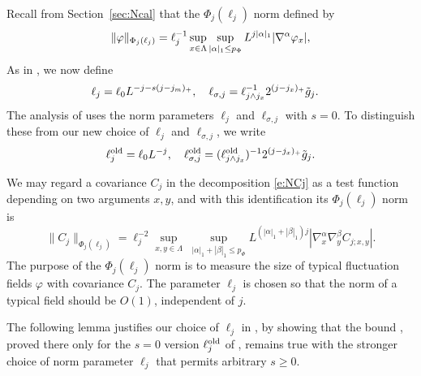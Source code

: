 Recall from Section~\ref{sec:Ncal} that the $\Phi_j(\ell_j)$ norm defined by
\begin{equation}
\lbeq{phinorm}
\|\varphi\|_{\Phi_j(\ell_j)}
=
\ell_j^{-1}
\sup_{x\in \Lambda}
\sup_{|\alpha|_1  \le p_\Phi}
L^{j|\alpha|_1}
|\nabla^{\alpha} \varphi_x|,
\end{equation}
As in , we now define
\begin{align}
\label{e:elldef}
\ell_j &= \ell_0 L^{-j - s (j - j_m)_+}, \quad
\ell_{\sigma,j}
=
\ell_{j \wedge j_{x}}^{-1} 2^{(j - j_{x})_+} \tilde{g}_j.
\end{align}
The analysis of \cite{BS-rg-IE,BS-rg-step} uses the norm parameters $\ell_j$ and $\ell_{\sigma,j}$ with $s = 0$.
To distinguish these from our
new choice  of $\ell_j$ and $\ell_{\sigma,j}$, we write
\begin{equation}
\label{e:ell-old}
    \ell_j^{\mathrm{old}} = \ell_0 L^{-j},
    \quad
    \ell_{\sigma,j}^{\mathrm{old}}  =
    (\ell_{j \wedge j_{x}}^{\rm old})^{-1}2^{(j - j_{x})_+}\tilde{g}_j.
\end{equation}

We may regard a covariance $C_j$ in the decomposition \eqref{e:NCj}
as a test function depending on
two arguments $x,y$, and with this identification its $\Phi_j(\ell_j)$
norm is
\begin{equation}
    \label{e:Phinorm}
    \|C_j\|_{\Phi_{j}(\ell_j)}  =
    \ell_j^{-2}
    \sup_{x,y\in \Lambda}
    \;
    \sup_{|\alpha|_1 + |\beta|_1 \le p_\Phi}
    L^{(|\alpha|_1+  |\beta|_1)j}
    |\nabla_x^{\alpha} \nabla_y^{\beta} C_{j;x,y}|.
\end{equation}
The purpose of the $\Phi_j(\ell_j)$ norm is to measure the size of typical
fluctuation fields $\varphi$ with covariance $C_j$.
The parameter $\ell_j$ is chosen so that the norm of a typical field should
be $O(1)$, independent of $j$.

The following lemma justifies our choice of $\ell_j$
in , by showing that the
bound \cite[\eqref{IE-e:CLbd}]{BS-rg-IE}, proved there only for the $s=0$ version
$\ell_j^{\mathrm{old}}$ of ,
remains true with the stronger
choice of norm parameter $\ell_j$ that permits arbitrary $s \ge 0$.

